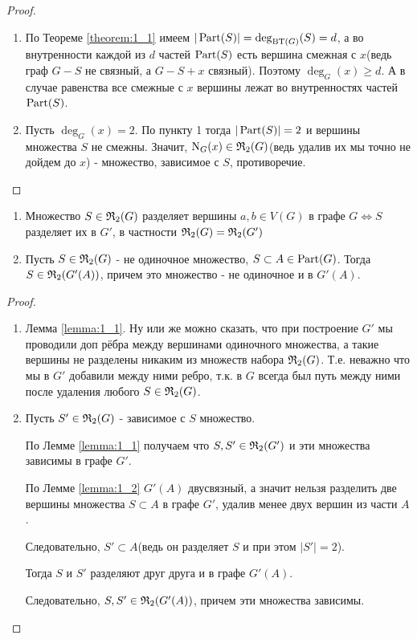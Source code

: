\begin{proof}
	\begin{enumerate}
		\item По Теореме \ref{theorem:1_1} имеем $|\operatorname{Part}(S)| = \deg_{\operatorname{BT}(G)}(S) = d$, а во внутренности каждой из $d$ частей  $\operatorname{Part}(S)$ есть вершина смежная с  $x$(ведь граф $G - S$ не связный, а  $G - S + x$ связный).
			Поэтому $\deg_G(x) \geqslant d$.
			А в случае равенства все смежные с $x$ вершины лежат во внутренностях частей  $\operatorname{Part}(S)$.
		\item Пусть  $\deg_G(x) = 2$.
			По пункту 1 тогда  $|\operatorname{Part}(S)| = 2$ и вершины множества  $S$ не смежны.
			Значит, $\operatorname{N}_G(x) \in \mathfrak{R}_2(G)$(ведь удалив их мы точно не дойдем до $x$) - множество, зависимое с $S$, противоречие.
	\end{enumerate}
\end{proof}

\begin{customlm}{2.2} \label{lemma:2_2}

	\begin{enumerate}
		\item Множество $S \in \mathfrak{R}_2(G)$ разделяет вершины $a, b \in V(G)$ в графе $G \iff S$ разделяет их в $G'$, в частности  $\mathfrak{R}_2(G) = \mathfrak{R}_2(G')$ 
		\item Пусть $S \in \mathfrak{R}_2(G)$ - не одиночное множество, $S \subset A \in \operatorname{Part}(G)$. 
	Тогда $S \in \mathfrak{R}_2(G'(A))$, причем это множество - не одиночное и в  $G'(A)$.
	\end{enumerate}

\end{customlm}

\begin{proof}
	\begin{enumerate}
		\item Лемма \ref{lemma:1_1}. Ну или же можно сказать, что при построение $G'$ мы проводили доп рёбра между вершинами одиночного множества, а такие вершины не разделены никаким из множеств набора $\mathfrak{R}_2(G)$. Т.е. неважно что мы в  $G'$ добавили между ними ребро, т.к. в $G$ всегда был путь между ними после удаления любого $S \in \mathfrak{R}_2(G)$.
		\item 
	Пусть $S' \in \mathfrak{R}_2(G)$ - зависимое с  $S$ множество.

	По Лемме \ref{lemma:1_1} получаем что $S, S' \in \mathfrak{R}_2(G')$ и эти множества зависимы в графе $G'$.

	По Лемме \ref{lemma:1_2} $G'(A)$ двусвязный, а значит нельзя разделить две вершины множества  $S \subset A$ в графе  $G'$, удалив менее двух вершин из части  $A$.

	Следовательно,  $S' \subset A$(ведь он разделяет $S$ и при этом $|S'| = 2$).

	Тогда $S$ и  $S'$ разделяют друг друга и в графе $G'(A)$.

	Следовательно,  $S, S' \in \mathfrak{R}_2(G'(A))$, причем эти множества зависимы.
	\end{enumerate}

\end{proof}

